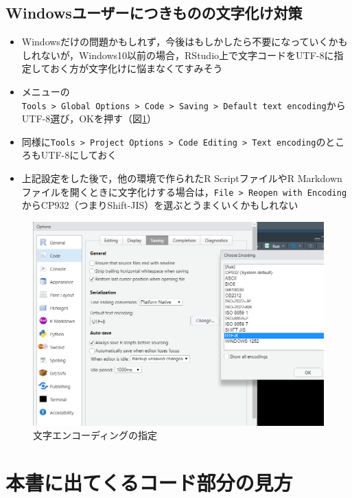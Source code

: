 \documentclass[
  xelatex,ja=standard, b5paper]{bxjsbook}
\providecommand{\tightlist}{%
  \setlength{\itemsep}{0pt}\setlength{\parskip}{0pt}}
\begin{document}
\hypertarget{p-utf8}{%
\subsection{Windowsユーザーにつきものの文字化け対策}\label{p-utf8}}

\begin{itemize}
\tightlist
\item
  Windowsだけの問題かもしれず，今後はもしかしたら不要になっていくかもしれないが，Windows10以前の場合，RStudio上で文字コードをUTF-8に指定しておく方が文字化けに悩まなくてすみそう
\item
  メニューの\texttt{Tools\ \textgreater{}\ Global\ Options\ \textgreater{}\ Code\ \textgreater{}\ Saving\ \textgreater{}\ Default\ text\ encoding}からUTF-8選び，OKを押す（図\ref{fig:utf8}）
\item
  同様に\texttt{Tools\ \textgreater{}\ Project\ Options\ \textgreater{}\ Code\ Editing\ \textgreater{}\ Text\ encoding}のところもUTF-8にしておく
\item
  上記設定をした後で，他の環境で作られたR ScriptファイルやR Markdownファイルを開くときに文字化けする場合は，\texttt{File\ \textgreater{}\ Reopen\ with\ Encoding}からCP932（つまりShift-JIS）を選ぶとうまくいくかもしれない
\end{itemize}

\begin{figure}

{\centering \includegraphics[width=0.7\linewidth]{images/utf8} 

}

\caption{文字エンコーディングの指定}\label{fig:utf8}
\end{figure}

\hypertarget{p-howtoread}{%
\section{本書に出てくるコード部分の見方}\label{p-howtoread}}
\end{document}
